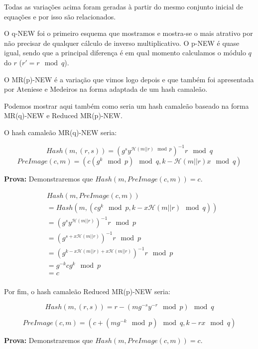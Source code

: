 \documentclass[a4paper]{article}
\begin{document}
    Todas as variações acima foram geradas à partir do mesmo conjunto
    inicial de equações e por isso são relacionados.
    
    O q-NEW foi o primeiro esquema que mostramos e mostra-se o mais
    atrativo por não precisar de qualquer cálculo de inverso
    multiplicativo. O p-NEW é quase igual, sendo que a principal diferença
    é em qual momento calculamos o módulo $q$ do $r$ ($r'=r \mod q$).
    
    O MR(p)-NEW é a variação que vimos logo depois e que também foi
    apresentada por Ateniese e Medeiros na forma adaptada de um hash
    camaleão.
    
    Podemos mostrar aqui também como seria um hash camaleão baseado na
    forma MR(q)-NEW e Reduced MR(p)-NEW.
    
    O hash camaleão MR(q)-NEW seria:
    
    $$
    Hash(m, (r, s)) = (g^sy^{\mathcal{H}(m||r) \mod p})^{-1}r \mod q
    $$
    $$
    PreImage(c, m) = (c(g^k \mod p) \mod q, k-\mathcal{H}(m||r)x \mod q)
    $$
    
    \textbf{Prova: }Demonstraremos que $Hash(m, PreImage(c, m)) = c$.
    
    \begin{equation*}
      \begin{split}
        &Hash(m, PreImage(c, m))\\
        &= Hash(m, (cg^{k} \mod p, k-x\mathcal{H}(m||r) \mod q))\\
        &= (g^sy^{\mathcal{H}(m||r)})^{-1}r \mod p\\
        &= (g^{s+x\mathcal{H}(m||r)})^{-1}r \mod p\\
        &= (g^{k-x\mathcal{H}(m||r)+x\mathcal{H}(m||r)})^{-1}r \mod p\\
        &= g^{-k}cg^{k} \mod p\\
        &= c\\
      \end{split}
    \end{equation*}
    
    Por fim, o hash camaleão Reduced MR(p)-NEW seria:
    
    $$
    Hash(m, (r, s)) = r-(mg^{-s}y^{-r} \mod p) \mod q
    $$
    
    $$
    PreImage(c, m) = (c+(mg^{-k} \mod p) \mod q, k-rx \mod q)
    $$
    
    \textbf{Prova: }Demonstraremos que $Hash(m, PreImage(c, m)) = c$.
    
\end{document}
